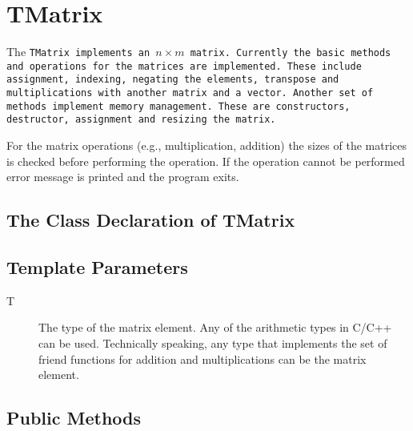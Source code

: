 \section{TMatrix}

The \tt TMatrix  \rm implements an $n \times  m$ matrix. Currently the
basic methods and operations  for the matrices are implemented.  These
include  assignment, indexing,  negating the  elements,  transpose and
multiplications  with another  matrix  and a  vector.  Another set  of
methods   implement  memory   management.   These   are  constructors,
destructor, assignment and resizing the matrix.

For the  matrix operations (e.g., multiplication,  addition) the sizes
of the  matrices is checked  before performing the operation.   If the
operation cannot be performed error message is printed and the program
exits.

\subsection{The Class Declaration of TMatrix}

\subsection{Template Parameters}

\begin{description}
  \item[T] The type of the matrix element. Any of the 
   arithmetic types in C/C++ can be used. Technically speaking, any type that
   implements the set of friend functions for addition and
   multiplications can be the matrix element.
\end{description}

\subsection{Public Methods}

